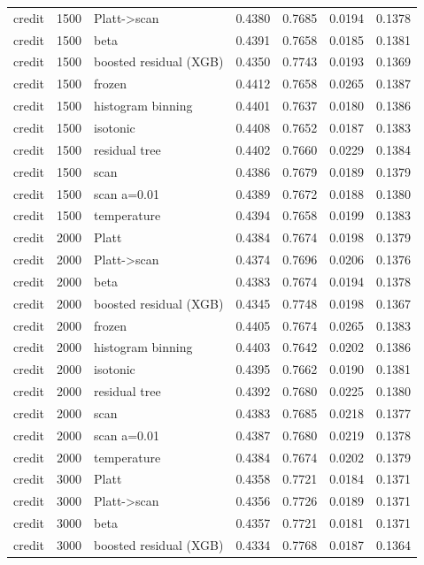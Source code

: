 \begin{tabular}{lllrrrr}
credit & 1500 & Platt->scan & 0.4380 & 0.7685 & 0.0194 & 0.1378 \\
credit & 1500 & beta & 0.4391 & 0.7658 & 0.0185 & 0.1381 \\
credit & 1500 & boosted residual (XGB) & 0.4350 & 0.7743 & 0.0193 & 0.1369 \\
credit & 1500 & frozen & 0.4412 & 0.7658 & 0.0265 & 0.1387 \\
credit & 1500 & histogram binning & 0.4401 & 0.7637 & 0.0180 & 0.1386 \\
credit & 1500 & isotonic & 0.4408 & 0.7652 & 0.0187 & 0.1383 \\
credit & 1500 & residual tree & 0.4402 & 0.7660 & 0.0229 & 0.1384 \\
credit & 1500 & scan & 0.4386 & 0.7679 & 0.0189 & 0.1379 \\
credit & 1500 & scan a=0.01 & 0.4389 & 0.7672 & 0.0188 & 0.1380 \\
credit & 1500 & temperature & 0.4394 & 0.7658 & 0.0199 & 0.1383 \\
credit & 2000 & Platt & 0.4384 & 0.7674 & 0.0198 & 0.1379 \\
credit & 2000 & Platt->scan & 0.4374 & 0.7696 & 0.0206 & 0.1376 \\
credit & 2000 & beta & 0.4383 & 0.7674 & 0.0194 & 0.1378 \\
credit & 2000 & boosted residual (XGB) & 0.4345 & 0.7748 & 0.0198 & 0.1367 \\
credit & 2000 & frozen & 0.4405 & 0.7674 & 0.0265 & 0.1383 \\
credit & 2000 & histogram binning & 0.4403 & 0.7642 & 0.0202 & 0.1386 \\
credit & 2000 & isotonic & 0.4395 & 0.7662 & 0.0190 & 0.1381 \\
credit & 2000 & residual tree & 0.4392 & 0.7680 & 0.0225 & 0.1380 \\
credit & 2000 & scan & 0.4383 & 0.7685 & 0.0218 & 0.1377 \\
credit & 2000 & scan a=0.01 & 0.4387 & 0.7680 & 0.0219 & 0.1378 \\
credit & 2000 & temperature & 0.4384 & 0.7674 & 0.0202 & 0.1379 \\
credit & 3000 & Platt & 0.4358 & 0.7721 & 0.0184 & 0.1371 \\
credit & 3000 & Platt->scan & 0.4356 & 0.7726 & 0.0189 & 0.1371 \\
credit & 3000 & beta & 0.4357 & 0.7721 & 0.0181 & 0.1371 \\
credit & 3000 & boosted residual (XGB) & 0.4334 & 0.7768 & 0.0187 & 0.1364 \\

\end{tabular}

